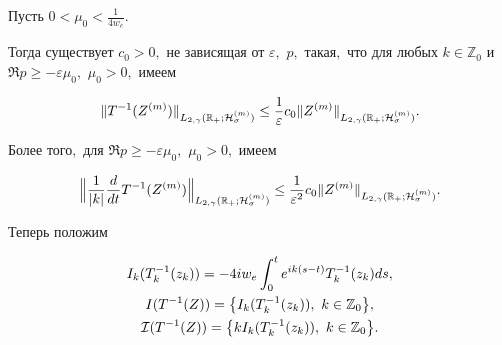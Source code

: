 \smallskip



\begin{lemma}[1]Пусть $0<\mu_0<\frac1{4w_e}.$ 

Тогда существует $c_0>0,$ не зависящая от $\varepsilon,$ $p,$ такая$,$ что для любых $k\in \mathbb Z_0$ и $\Re p\ge -\varepsilon \mu_0,$ $\mu_0>0,$ имеем

\begin{equation}

\| T^{-1}(Z^{(m)})\|_{L_{2,\gamma}(\mathbb R_{+};{\cal H}^{(m)}_\sigma)}\le\frac1\varepsilon c_0

\| Z^{(m)} \|_{L_{2,\gamma}(\mathbb R_{+};{\cal H}^{(m)}_\sigma)}.

\label{duh:estT-1Z}

 \end{equation}

Более того$,$ для $\Re p\ge -\varepsilon \mu_0,$ $\mu_0>0,$ имеем

\begin{equation}

\Bigl\|\frac1{|k|} \frac{d}{dt}T^{-1}(Z^{(m)})\Bigr\|_{L_{2,\gamma}(\mathbb R_{+};{\cal H}^{(m)}_\sigma)}\le \frac1{\varepsilon^2}  c_0 \| Z^{(m)} \|_{L_{2,\gamma}(\mathbb R_{+};{\cal H}^{(m)}_\sigma)}.

\label{duh:estT-2Z}

 \end{equation}

\end{lemma}



\smallskip



Теперь положим

\begin{gather*}

I_k(T^{-1}_k(z_k))=-4iw_e \int_0^t e^{ik(s-t)} T^{-1}_k(z_k) ds,

\\

I(T^{-1}(Z))=\bigl\{I_k(T^{-1}_k(z_k)),~k\in \mathbb Z_0 \bigr \}, \\

{\cal I}(T^{-1}( Z))= \bigl \{k I_k(T^{-1}_k(z_k)),~k\in \mathbb Z_0 \bigr \}.

\end{gather*}



\smallskip



